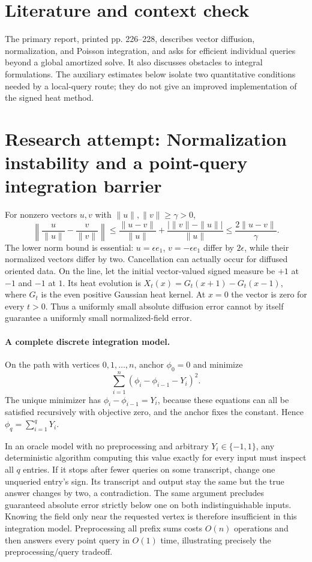 \documentclass[11pt]{article}
\begin{document}
\section{Literature and context check}
The primary report, printed pp. 226--228, describes vector diffusion, normalization, and Poisson integration, and asks for efficient individual queries beyond a global amortized solve. It also discusses obstacles to integral formulations. The auxiliary estimates below isolate two quantitative conditions needed by a local-query route; they do not give an improved implementation of the signed heat method.
\section{Research attempt: Normalization instability and a point-query integration barrier}

For nonzero vectors $u,v$ with $\|u\|,\|v\|\geq\gamma>0$,
\[
\left\|\frac{u}{\|u\|}-\frac{v}{\|v\|}\right\|
\leq\frac{\|u-v\|}{\|u\|}
+\frac{|\|v\|-\|u\||}{\|u\|}
\leq\frac{2\|u-v\|}{\gamma}.
\]
The lower norm bound is essential: $u=\epsilon e_1$, $v=-\epsilon e_1$ differ by $2\epsilon$, while their normalized vectors differ by two. Cancellation can actually occur for diffused oriented data. On the line, let the initial vector-valued signed measure be $+1$ at $-1$ and $-1$ at $1$. Its heat evolution is $X_t(x)=G_t(x+1)-G_t(x-1)$, where $G_t$ is the even positive Gaussian heat kernel. At $x=0$ the vector is zero for every $t>0$. Thus a uniformly small absolute diffusion error cannot by itself guarantee a uniformly small normalized-field error.

\paragraph{A complete discrete integration model.}
On the path with vertices $0,1,\ldots,n$, anchor $\phi_0=0$ and minimize
\[
\sum_{i=1}^n(\phi_i-\phi_{i-1}-Y_i)^2.
\]
The unique minimizer has $\phi_i-\phi_{i-1}=Y_i$, because these equations can all be satisfied recursively with objective zero, and the anchor fixes the constant. Hence $\phi_q=\sum_{i=1}^qY_i$.

In an oracle model with no preprocessing and arbitrary $Y_i\in\{-1,1\}$, any deterministic algorithm computing this value exactly for every input must inspect all $q$ entries. If it stops after fewer queries on some transcript, change one unqueried entry's sign. Its transcript and output stay the same but the true answer changes by two, a contradiction. The same argument precludes guaranteed absolute error strictly below one on both indistinguishable inputs. Knowing the field only near the requested vertex is therefore insufficient in this integration model. Preprocessing all prefix sums costs $O(n)$ operations and then answers every point query in $O(1)$ time, illustrating precisely the preprocessing/query tradeoff.
\end{document}
